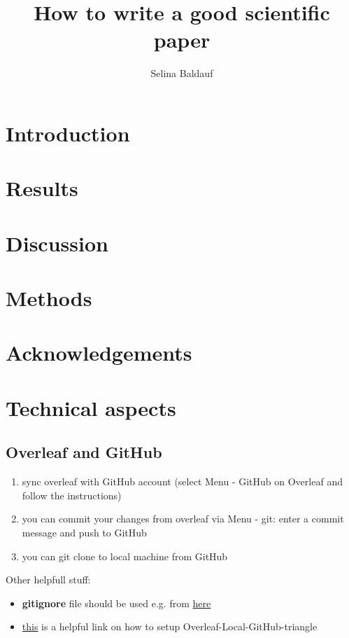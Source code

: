 \documentclass[fleqn,10pt]{wlscirep}
\title{How to write a good scientific paper}
\author[1,*]{Selina Baldauf}
\affil[1]{FU Berlin}
\begin{document}
\flushbottom
\maketitle

\thispagestyle{empty}



\section*{Introduction}



\section*{Results}




\section*{Discussion}


\section*{Methods}




\section*{Acknowledgements}

\section*{Technical aspects}
\subsection{Overleaf and GitHub}
\begin{enumerate}
	\item sync overleaf with GitHub account (select Menu - GitHub on Overleaf and follow the instructions)
	\item you can commit your changes from overleaf via Menu - git: enter a commit message and push to GitHub
	\item you can git clone to local machine from GitHub
\end{enumerate}
Other helpfull stuff:
\begin{itemize}
	\item \textbf{gitignore} file should be used e.g. from \href{https://github.com/github/gitignore/blob/master/TeX.gitignore}{here} 
	\item \href{https://ineed.coffee/3454/how-to-synchronize-an-overleaf-latex-paper-with-a-github-repository/}{this} is a helpful link on how to setup Overleaf-Local-GitHub-triangle
\end{itemize}
\end{document}
